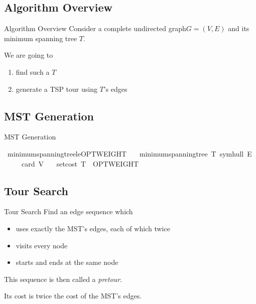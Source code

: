\documentclass[%
	sans,
	12pt,
]{beamer}
\def\isacartoucheopen{}%
\def\isacartoucheclose{}%
\begin{document}
\subsection{Algorithm Overview}
\begin{frame}{Algorithm Overview}
Consider a complete undirected graph$G = (V, E)$ and its minimum spanning tree $T$.\pause%

We are going to
\begin{enumerate}
	\item find such a $T$\pause
	\item generate a TSP tour using $T$'s edges
\end{enumerate}
\end{frame}

\subsection{MST Generation}
\begin{frame}{MST Generation}\pause
\begin{isabelle}
\isamarkupfalse%
\ minimum{\isacharunderscore}spanning{\isacharunderscore}tree{\isacharunderscore}le{\isacharunderscore}OPTWEIGHT{\isacharcolon}\isanewline
\ \ \ {\isacartoucheopen}minimum{\isacharunderscore}spanning{\isacharunderscore}tree\ T{\isacharprime}\ {\isacharparenleft}symhull\ E{\isacharparenright}{\isacartoucheclose}\isanewline
\ \ \ {\isacartoucheopen}{}\ {\isasymle}\ card\ V{\isacartoucheclose}\isanewline
\ \ \ {\isacartoucheopen}set{\isacharunderscore}cost\ T{\isacharprime}\ {\isasymle}\ OPTWEIGHT{\isacartoucheclose}
\end{isabelle}
\end{frame}

\subsection{Tour Search}
\begin{frame}{Tour Search}
Find an edge sequence which\pause
\begin{itemize}
	\item uses exactly the MST's edges, each of which twice\pause
	\item visits every node\pause
	\item starts and ends at the same node\pause
\end{itemize}
This sequence is then called a \textit{pretour}.\pause

Its cost is twice the cost of the MST's edges.
\end{frame}
\end{document}
